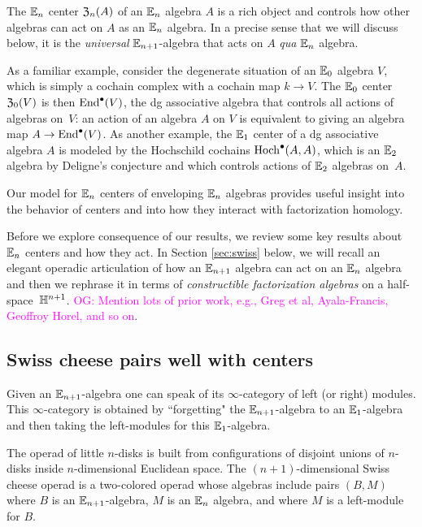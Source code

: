 \documentclass[11pt]{amsart}
\numberwithin{equation}{section}
\def\owen{\textcolor{magenta}{OG: }\textcolor{magenta}}
\begin{document}
The $\mathbb E_n$ center ${\frak Z}_n(A)$ of an $\mathbb E_n$ algebra $A$ is a rich object 
and controls how other algebras can act on $A$ as an $\mathbb E_n$ algebra.
In a precise sense that we will discuss below, 
it is the {\em universal} $\mathbb E_{n+1}$-algebra that acts on $A$ {\em qua} $\mathbb E_n$ algebra. 

As a familiar example, consider the degenerate situation of an $\mathbb E_0$ algebra $V$, 
which is simply a cochain complex with a cochain map $k \to V$.
The $\mathbb E_0$ center ${\frak Z}_0(V)$ is then ${\rm End}^\bullet(V)$,
the dg associative algebra that controls all actions of algebras on~$V$:
an action of an algebra $A$ on $V$ is equivalent to giving an algebra map $A \to {\rm End}^\bullet(V)$.
As another example, the $\mathbb E_1$ center of a dg associative algebra $A$ is modeled by the Hochschild cochains ${\rm Hoch}^\bullet(A,A)$,
which is an $\mathbb E_2$ algebra by Deligne's conjecture and which controls actions of $\mathbb E_2$ algebras on~$A$.

Our model for $\mathbb E_n$ centers of enveloping $\mathbb E_n$ algebras provides useful insight into the behavior of centers and into how they interact with factorization homology.

Before we explore consequence of our results,
we review some key results about $\mathbb E_n$ centers and how they act.
In Section \ref{sec:swiss} below, we will recall an elegant operadic articulation of how an $\mathbb E_{n+1}$ algebra can act on an $\mathbb E_n$ algebra 
and then we rephrase it in terms of {\em constructible factorization algebras} on a half-space~$\mathbb H^{n+1}$. 
\owen{Mention lots of prior work, e.g., Greg et al, Ayala-Francis, Geoffroy Horel, and so on}.

\subsection{Swiss cheese pairs well with centers}

Given an $\mathbb E_{n+1}$-algebra one can speak of its $\infty$-category of left (or right) modules.
This $\infty$-category is obtained by ``forgetting" the $\mathbb E_{n+1}$-algebra to an $\mathbb E_1$-algebra and then taking the left-modules for this $\mathbb E_1$-algebra.

The operad of little $n$-disks is built from configurations of disjoint unions of $n$-disks inside $n$-dimensional Euclidean space.
The $(n+1)$-dimensional Swiss cheese operad is a two-colored operad whose algebras include pairs $(B, M)$ where $B$ is an $\mathbb E_{n+1}$-algebra, $M$ is an $\mathbb E_n$ algebra, and where $M$ is a left-module for $B$.
\end{document}
